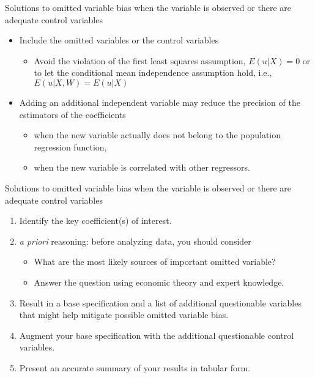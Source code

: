 \documentclass[presentation,10pt]{beamer}
\begin{document}
\begin{frame}[label={sec:org8f437d6}]{Solutions to omitted variable bias when the variable is observed or there are adequate control variables}
\begin{itemize}
\item Include the omitted variables or the control variables
\begin{itemize}
\item Avoid the violation of the first least squares assumption, \(E(u |
    X ) = 0\) or to let the conditional mean independence assumption
hold, i.e., \(E(u|X, W) = E(u|X)\)
\end{itemize}
\end{itemize}

\vspace{0.2cm} 

\begin{itemize}
\item Adding an additional independent variable may reduce the precision of the
estimators of the coefficients 
\begin{itemize}
\item when the new variable actually does not belong to the population
regression function,
\item when the new variable is correlated with other regressors.
\end{itemize}
\end{itemize}
\end{frame}

\begin{frame}[label={sec:orgafc0301}]{Solutions to omitted variable bias when the variable is observed or there are adequate control variables}
\begin{enumerate}
\item Identify the key coefficient(s) of interest.

\item \emph{a priori} reasoning: before analyzing data, you should consider
\begin{itemize}
\item What are the most likely sources of important omitted variable?
\item Answer the question using economic theory and expert knowledge.
\end{itemize}

\item Result in a base specification and a list of additional
questionable variables that might help mitigate possible omitted
variable bias.

\item Augment your base specification with the additional questionable
control variables.

\item Present an accurate summary of your results in tabular form.
\end{enumerate}
\end{frame}
\end{document}
